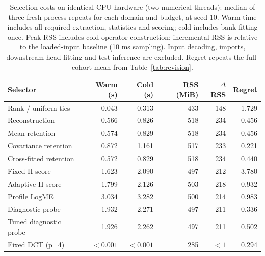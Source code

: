 \begin{table}[tb]\centering\small
\caption{Selection costs on identical CPU hardware (two numerical threads): median of three fresh-process repeats for each domain and budget, at seed 10. Warm time includes all required extraction, statistics and scoring; cold includes bank fitting once. Peak RSS includes cold operator construction; incremental RSS is relative to the loaded-input baseline (10 ms sampling). Input decoding, imports, downstream head fitting and test inference are excluded. Regret repeats the full-cohort mean from Table~\ref{tab:revision}.}\label{tab:cost}
\begin{tabular}{lrrrrr}\toprule
Selector & Warm (s) & Cold (s) & RSS (MiB) & $\Delta$RSS & Regret\\\midrule
Rank / uniform ties & 0.043 & 0.313 & 433 & 148 & 1.729\\
Reconstruction & 0.566 & 0.826 & 518 & 234 & 0.456\\
Mean retention & 0.574 & 0.829 & 518 & 234 & 0.456\\
Covariance retention & 0.872 & 1.161 & 517 & 233 & 0.221\\
Cross-fitted retention & 0.572 & 0.829 & 518 & 234 & 0.440\\
Fixed H-score & 1.623 & 2.090 & 497 & 212 & 3.780\\
Adaptive H-score & 1.799 & 2.126 & 503 & 218 & 0.932\\
Profile LogME & 3.034 & 3.282 & 500 & 214 & 0.983\\
Diagnostic probe & 1.932 & 2.271 & 497 & 211 & 0.336\\
Tuned diagnostic probe & 1.926 & 2.262 & 497 & 211 & 0.502\\
Fixed DCT (p=4) & $<0.001$ & $<0.001$ & 285 & $<1$ & 0.294\\
\bottomrule\end{tabular}
\end{table}
